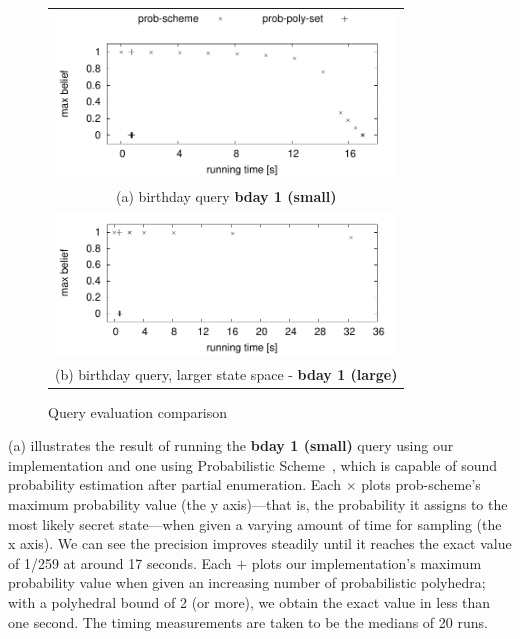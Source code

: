 \begin{figure}[t!]
\centering
\begin{tabular}{c}
\includegraphics[width=9cm]{figures/plot_bday.pdf} \\
(a) birthday query \textbf{bday 1 (small)} \\
\includegraphics[width=9cm]{figures/plot_bday_large.pdf} \\
(b) birthday query, larger state space - \textbf{bday 1 (large)} \\
\end{tabular}
\caption{Query evaluation comparison}
\label{fig:plots_bday}
\end{figure}

(a) illustrates the result of running the
\textbf{bday 1 (small)} query using our implementation and one using
Probabilistic Scheme~\cite{radul07probscheme}, which is capable of
sound probability estimation after partial enumeration.  Each $\times$
plots prob-scheme's maximum probability value (the y axis)---that is,
the probability it assigns to the most likely secret state---when
given a varying amount of time for sampling (the x axis).  We can see
the precision improves steadily until it reaches the exact value of
1/259 at around 17 seconds. Each $+$ plots our implementation's
maximum probability value when given an increasing number of
probabilistic polyhedra; with a polyhedral bound of 2 (or more), we
obtain the exact value in less than one second. The timing
measurements are taken to be the medians of 20 runs.

